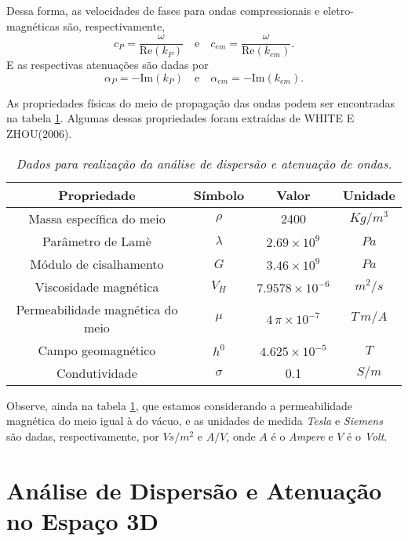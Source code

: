 Dessa forma, as velocidades de fases para ondas compressionais e eletro-magn\'eticas s\~ao, respectivamente,
\begin{equation*}
c_{P}=\frac{\omega}{\text{Re}(k_{P})}\quad\text{e}\quad c_{em}=\frac{\omega}{\text{Re}(k_{em})}.
\end{equation*}
E as respectivas atenua\c{c}\~oes s\~ao dadas por
\begin{equation*}
\alpha_{P}=-\text{Im}(k_{P})\quad\text{e}\quad \alpha_{em}=-\text{Im}(k_{em}).
\end{equation*}

As propriedades f\'isicas do meio de propaga\c{c}\~ao das ondas podem ser encontradas na tabela \ref{tab.dados_dispersao}. Algumas dessas propriedades foram extra\'idas de WHITE E ZHOU(2006).


\begin{table}
\begin{center}
\begin{tabular}{|c|c|c|c|}
\hline 
Propriedade & S\'imbolo & Valor & Unidade \\ 
\hline 
Massa espec\'ifica do meio & $\rho$ & 2400 & $Kg/m^3$ \\ 
\hline 
Par\^ametro de Lam\`e & $\lambda$ & $2.69\times 10^9$ & $Pa$ \\ 
\hline 
M\'odulo de cisalhamento & $G$ & $3.46\times 10^9$ & $Pa$ \\ 
\hline 
Viscosidade magn\'etica & $V_H$ & $7.9578\times 10^{-6}$ & $m^2/s$ \\ 
\hline 
Permeabilidade magn\'etica do meio & $\mu$ & $4\,\pi\times 10^{-7}$ & $T\,m/A$ \\ 
\hline 
Campo geomagn\'etico & $h^0$ & $4.625\times 10^{-5}$ & $T$ \\ 
\hline 
Condutividade & $\sigma$ & 0.1 & $S/m$ \\
\hline
\end{tabular}
\end{center}
\caption{\textit{Dados para realiza\c{c}\~ao da an\'alise de dispers\~ao e atenua\c{c}\~ao de ondas.}}
\label{tab.dados_dispersao}
\end{table}

Observe, ainda na tabela \ref{tab.dados_dispersao}, que estamos considerando a permeabilidade magn\'etica do meio igual \`a do v\'acuo, e as unidades de medida \textit{Tesla} e \textit{Siemens} s\~ao dadas, respectivamente, por $Vs/m^2$ e $A/V$, onde $A$ \'e o \textit{Ampere} e $V$ \'e o \textit{Volt}.

\section{An\'alise de Dispers\~ao e Atenua\c{c}\~ao no Espa\c{c}o 3D}


